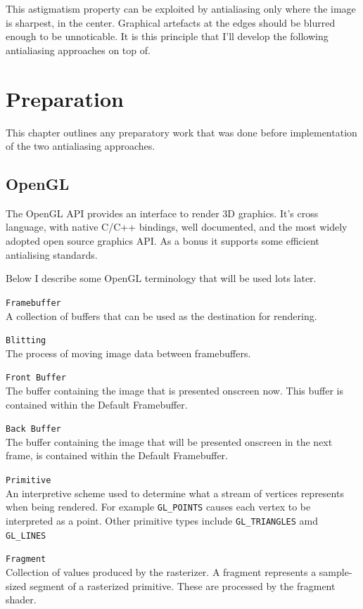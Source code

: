 \documentclass[12pt,a4paper,twoside,openright]{report}
\begin{document}
This astigmatism property can be exploited by antialiasing only where the image is sharpest, in the center. Graphical artefacts at the edges should be blurred enough to be unnoticable. It is this principle that I'll develop the following antialiasing approaches on top of.

\chapter{Preparation}

This chapter outlines any preparatory work that was done before implementation of the two antialiasing approaches.

\section{OpenGL}

The OpenGL API provides an interface to render 3D graphics. It's cross language, with native C/C++ bindings, well documented, and the most widely adopted open source graphics API. As a bonus it supports some efficient antialising standards.

Below I describe some OpenGL terminology that will be used lots later.

\begin{description}

\item\texttt{Framebuffer} \\
  A collection of buffers that can be used as the destination for rendering.

\item\texttt{Blitting} \\
  The process of moving image data between framebuffers.

\item\texttt{Front Buffer} \\
  The buffer containing the image that is presented onscreen now. This buffer is contained within the Default Framebuffer.

\item\texttt{Back Buffer} \\
  The buffer containing the image that will be presented onscreen in the next frame, is contained within the Default Framebuffer. 

\item\texttt{Primitive} \\
  An interpretive scheme used to determine what a stream of vertices represents when being rendered. For example \texttt{GL\_POINTS} causes each vertex to be interpreted as a point. Other primitive types include \texttt{GL\_TRIANGLES} amd \texttt{GL\_LINES}
\item\texttt{Fragment} \\
  Collection of values produced by the rasterizer. A fragment represents a sample-sized segment of a rasterized primitive. These are processed by the fragment shader. 
\end{description}
\end{document}
